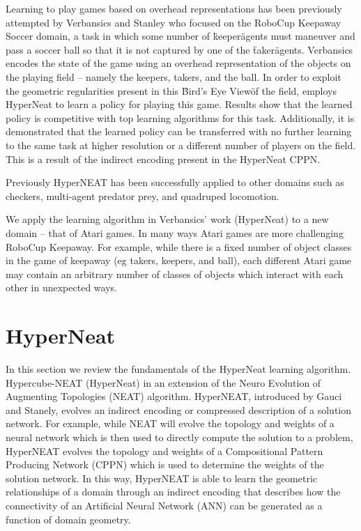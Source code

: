 \documentclass{article}
\begin{document}
Learning to play games based on overhead representations has been previously attempted by Verbansics and Stanley\cite{verbancsics10} who focused on the RoboCup Keepaway Soccer domain, a task in which some number of \"keeper\" agents must maneuver and pass a soccer ball so that it is not captured by one of the \"taker\" agents. Verbansics encodes the state of the game using an overhead representation of the objects on the playing field -- namely the keepers, takers, and the ball. In order to exploit the geometric regularities present in this \"Bird's Eye View\" of the field, employs HyperNeat to learn a policy for playing this game. Results show that the learned policy is competitive with top learning algorithms for this task. Additionally, it is demonstrated that the learned policy can be transferred with no further learning to the same task at higher resolution or a different number of players on the field. This is a result of the indirect encoding present in the HyperNeat CPPN. 

Previously HyperNEAT has been successfully applied to other domains such as checkers\cite{gauci08}, multi-agent predator prey\cite{ambrosio08}, and quadruped locomotion\cite{clune09}. 

We apply the learning algorithm in Verbansics' work (HyperNeat) to a new domain -- that of Atari games. In many ways Atari games are more challenging RoboCup Keepaway. For example, while there is a fixed number of object classes in the game of keepaway (eg takers, keepers, and ball), each different Atari game may contain an arbitrary number of classes of objects which interact with each other in unexpected ways. 

\section{HyperNeat}
In this section we review the fundamentals of the HyperNeat learning algorithm. Hypercube-NEAT (HyperNeat) in an extension of the Neuro Evolution of Augmenting Topologies (NEAT) algorithm\cite{stanley02}. HyperNEAT, introduced by Gauci and Stanely\cite{gauci08}, evolves an indirect encoding or compressed description of a solution network. For example, while NEAT will evolve the topology and weights of a neural network which is then used to directly compute the solution to a problem, HyperNEAT evolves the topology and weights of a Compositional Pattern Producing Network (CPPN) which is used to determine the weights of the solution network. In this way, HyperNEAT is able to learn the geometric relationships of a domain through an indirect encoding that describes how the connectivity of an Artificial Neural Network (ANN) can be generated as a function of domain geometry. 
\end{document}
